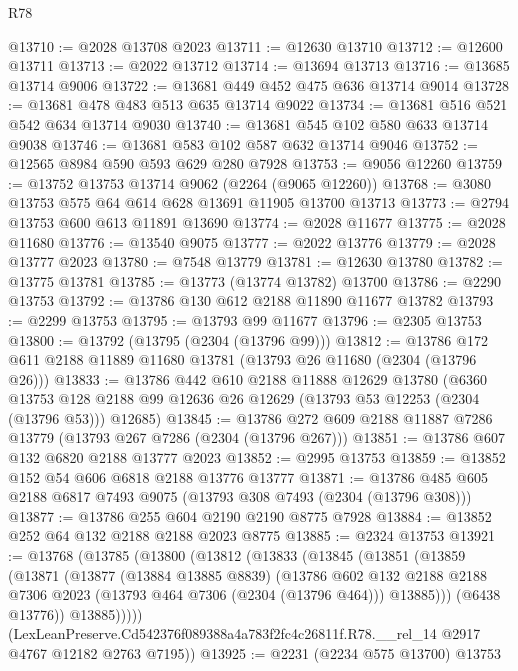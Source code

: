 \begin{lexlean}{R78}
\begin{coremodule}
@13710 := @2028 @13708 @2023
@13711 := @12630 @13710
@13712 := @12600 @13711
@13713 := @2022 @13712
@13714 := @13694 @13713
@13716 := @13685 @13714 @9006
@13722 := @13681 @449 @452 @475 @636 @13714 @9014
@13728 := @13681 @478 @483 @513 @635 @13714 @9022
@13734 := @13681 @516 @521 @542 @634 @13714 @9030
@13740 := @13681 @545 @102 @580 @633 @13714 @9038
@13746 := @13681 @583 @102 @587 @632 @13714 @9046
@13752 := @12565 @8984 @590 @593 @629 @280 @7928
@13753 := @9056 @12260
@13759 := @13752 @13753 @13714 @9062 (@2264 (@9065 @12260))
@13768 := @3080 @13753 @575 @64 @614 @628 @13691 @11905 @13700 @13713
@13773 := @2794 @13753 @600 @613 @11891 @13690
@13774 := @2028 @11677
@13775 := @2028 @11680
@13776 := @13540 @9075
@13777 := @2022 @13776
@13779 := @2028 @13777 @2023
@13780 := @7548 @13779
@13781 := @12630 @13780
@13782 := @13775 @13781
@13785 := @13773 (@13774 @13782) @13700
@13786 := @2290 @13753
@13792 := @13786 @130 @612 @2188 @11890 @11677 @13782
@13793 := @2299 @13753
@13795 := @13793 @99 @11677
@13796 := @2305 @13753
@13800 := @13792 (@13795 (@2304 (@13796 @99)))
@13812 := @13786 @172 @611 @2188 @11889 @11680 @13781 (@13793 @26 @11680 (@2304 (@13796 @26)))
@13833 := @13786
    @442
    @610
    @2188
    @11888
    @12629
    @13780
    (@6360 @13753 @128 @2188 @99 @12636 @26 @12629 (@13793 @53 @12253 (@2304 (@13796 @53))) @12685)
@13845 := @13786 @272 @609 @2188 @11887 @7286 @13779 (@13793 @267 @7286 (@2304 (@13796 @267)))
@13851 := @13786 @607 @132 @6820 @2188 @13777 @2023
@13852 := @2995 @13753
@13859 := @13852 @152 @54 @606 @6818 @2188 @13776 @13777
@13871 := @13786 @485 @605 @2188 @6817 @7493 @9075 (@13793 @308 @7493 (@2304 (@13796 @308)))
@13877 := @13786 @255 @604 @2190 @2190 @8775 @7928
@13884 := @13852 @252 @64 @132 @2188 @2188 @2023 @8775
@13885 := @2324 @13753
@13921 := @13768
    (@13785
      (@13800
        (@13812
          (@13833
            (@13845
              (@13851
                (@13859
                  (@13871
                    (@13877
                      (@13884 @13885 @8839)
                      (@13786
                        @602
                        @132
                        @2188
                        @2188
                        @7306
                        @2023
                        (@13793 @464 @7306 (@2304 (@13796 @464)))
                        @13885)))
                  (@6438 @13776))
                @13885)))))
      (LexLeanPreserve.Cd542376f089388a4a783f2fc4c26811f.R78.__rel_14
        @2917
        @4767
        @12182
        @2763
        @7195))
@13925 := @2231 (@2234 @575 @13700) @13753

\end{coremodule}
\end{lexlean}
